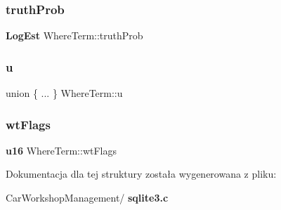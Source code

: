 \mbox{\label{struct_where_term_a6e6c9c0c1b959f0f4d30a8a00ac4eeec}} 
\subsubsection{truthProb}
{\footnotesize\ttfamily \textbf{ Log\+Est} Where\+Term\+::truth\+Prob}

\mbox{\label{struct_where_term_af45d7562aa40a32f1ae5df729979b6c7}} 
\subsubsection{u}
{\footnotesize\ttfamily union \{ ... \}   Where\+Term\+::u}

\mbox{\label{struct_where_term_a979984e12baf58f3661cb82d619a0786}} 
\subsubsection{wtFlags}
{\footnotesize\ttfamily \textbf{ u16} Where\+Term\+::wt\+Flags}



Dokumentacja dla tej struktury została wygenerowana z pliku\+:\begin{DoxyCompactItemize}
\item 
Car\+Workshop\+Management/\textbf{ sqlite3.\+c}\end{DoxyCompactItemize}
